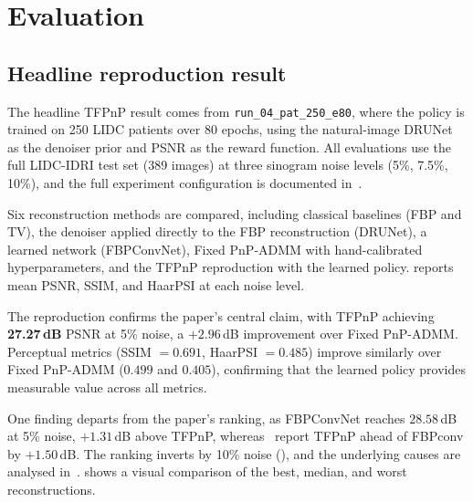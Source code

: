
\chapter{Evaluation}
\label{chap:results}

\section{Headline reproduction result}
\label{sec:headline}

The headline TFPnP result comes from \texttt{run\_04\_pat\_250\_e80}, where the policy is trained on 250 LIDC patients over 80 epochs, using the natural-image DRUNet as the denoiser prior and PSNR as the reward function. All evaluations use the full LIDC-IDRI test set (389 images) at three sinogram noise levels (5\%, 7.5\%, 10\%), and the full experiment configuration is documented in~.

Six reconstruction methods are compared, including classical baselines (FBP and TV), the denoiser applied directly to the FBP reconstruction (DRUNet), a learned network (FBPConvNet), Fixed PnP-ADMM with hand-calibrated hyperparameters, and the TFPnP reproduction with the learned policy.  reports mean PSNR, SSIM, and HaarPSI at each noise level.

The reproduction confirms the paper's central claim, with TFPnP achieving \textbf{27.27\,dB} PSNR at 5\% noise, a $+2.96$\,dB improvement over Fixed PnP-ADMM. Perceptual metrics (SSIM $= 0.691$, HaarPSI $= 0.485$) improve similarly over Fixed PnP-ADMM ($0.499$ and $0.405$), confirming that the learned policy provides measurable value across all metrics.

One finding departs from the paper's ranking, as FBPConvNet reaches $28.58$\,dB at 5\% noise, $+1.31$\,dB above TFPnP, whereas~\citet{Wei2022TFPnP} report TFPnP ahead of FBPconv by $+1.50$\,dB. The ranking inverts by 10\% noise (), and the underlying causes are analysed in~.  shows a visual comparison of the best, median, and worst reconstructions.

